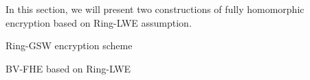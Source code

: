 In this section, we will present two constructions of fully homomorphic encryption based on Ring-LWE assumption.

\begin{subsection}{Ring-GSW encryption scheme~\cite{DBLP:journals/tc/KhedrGV16}}

  
\end{subsection}

\begin{subsection}{BV-FHE based on Ring-LWE~\cite{DBLP:conf/crypto/BrakerskiV11}}

\end{subsection}
